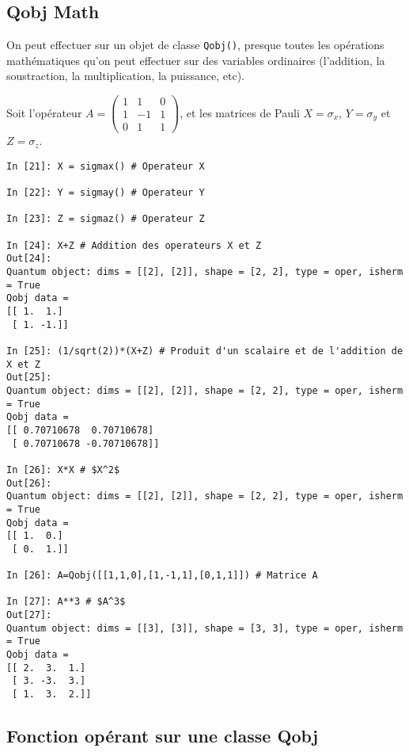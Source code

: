 \subsection{Qobj Math}

On peut effectuer sur un objet de classe \texttt{Qobj()}, presque toutes les 
opérations mathématiques qu'on peut effectuer sur des variables ordinaires 
(l'addition, la soustraction, la multiplication, la puissance, etc).\\
\begin{example}
Soit l'opérateur $A =\begin{pmatrix}1&1&0\\1&-1&1\\0&1&1\end{pmatrix}$, et les 
matrices de Pauli $X = \sigma_x$, $Y=\sigma_y$ et $Z = \sigma_z$.\\
\begin{lstlisting}
In [21]: X = sigmax() # Operateur X

In [22]: Y = sigmay() # Operateur Y

In [23]: Z = sigmaz() # Operateur Z

In [24]: X+Z # Addition des operateurs X et Z
Out[24]: 
Quantum object: dims = [[2], [2]], shape = [2, 2], type = oper, isherm = True
Qobj data =
[[ 1.  1.]
 [ 1. -1.]]

In [25]: (1/sqrt(2))*(X+Z) # Produit d'un scalaire et de l'addition de X et Z
Out[25]: 
Quantum object: dims = [[2], [2]], shape = [2, 2], type = oper, isherm = True
Qobj data =
[[ 0.70710678  0.70710678]
 [ 0.70710678 -0.70710678]]
 
In [26]: X*X # $X^2$
Out[26]: 
Quantum object: dims = [[2], [2]], shape = [2, 2], type = oper, isherm = True
Qobj data =
[[ 1.  0.]
 [ 0.  1.]]

In [26]: A=Qobj([[1,1,0],[1,-1,1],[0,1,1]]) # Matrice A

In [27]: A**3 # $A^3$
Out[27]: 
Quantum object: dims = [[3], [3]], shape = [3, 3], type = oper, isherm = True
Qobj data =
[[ 2.  3.  1.]
 [ 3. -3.  3.]
 [ 1.  3.  2.]]
 \end{lstlisting}
\end{example}

\subsection{Fonction opérant sur une classe Qobj}

